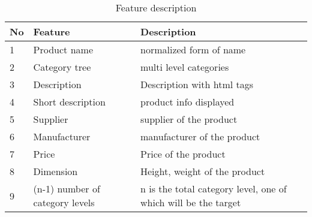 


\begin{table}[h]
      \centering
      \caption{Feature description}
      \label{table:feature_decription}
      \begin{tabular}{ lll }
            \toprule
            
            \textbf{No}& \textbf{Feature} & \textbf{Description}\\
            \midrule
            1&Product name & normalized form of name\\
            2&Category tree & multi level categories\\
            3&Description & Description with html tags\\         
            4&Short description  & product info displayed\\
            5&Supplier  &  supplier of the product\\
            6&Manufacturer  &  manufacturer of the product\\           
            7&Price  &  Price of the product\\
            8&Dimension  & Height, weight of the product\\
            9&(n-1) number of  category levels   &  n is the total category level, one of which will be the target\\
           
            \bottomrule
            \end{tabular}

            

\end{table}


